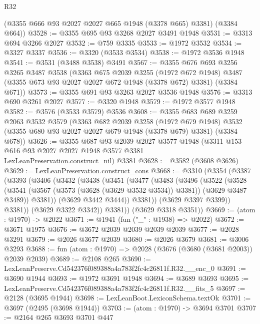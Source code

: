 \begin{lexlean}{R32}
\begin{coremodule}
      (@3355 @666 @93 @2027 @2027 @665 @1948 (@3378 @665) @3381)
      (@3384 @664))
@3528 := @3355 @695 @93 @3268 @2027 @3491 @1948
@3531 := @3313 @694 @3266 @2027
@3532 := @759 @3335
@3533 := @1972 @3532
@3534 := @3327 @3337
@3536 := @3320 (@3533 @3534)
@3538 := @1972 @3536 @1948
@3541 := @3531 (@3488 @3538) @3491
@3567 := @3355
    @676
    @693
    @3256
    @3265
    @3487
    @3538
    (@3363
      @675
      @2039
      @3255
      (@1972 @672 @1948)
      @3487
      (@3355 @673 @93 @2027 @2027 @672 @1948 (@3378 @672) @3381)
      (@3384 @671))
@3573 := @3355 @691 @93 @3263 @2027 @3536 @1948
@3576 := @3313 @690 @3261 @2027
@3577 := @3320 @1948
@3579 := @1972 @3577 @1948
@3582 := @3576 (@3533 @3579) @3536
@3608 := @3355
    @683
    @689
    @3259
    @2063
    @3532
    @3579
    (@3363
      @682
      @2039
      @3258
      (@1972 @679 @1948)
      @3532
      (@3355 @680 @93 @2027 @2027 @679 @1948 (@3378 @679) @3381)
      (@3384 @678))
@3626 := @3355
    @687
    @93
    @2039
    @2027
    @3577
    @1948
    (@3311 @153 @616 @93 @2027 @2027 @1948 @3577 @3381 LexLeanPreservation.construct_nil)
    @3381
@3628 := @3582 (@3608 @3626)
@3629 := LexLeanPreservation.construct_cons
@3668 := @3310
    (@3354
      (@3387
        (@3393
          (@3406
            (@3432
              (@3438
                (@3451
                  (@3477
                    (@3483
                      (@3496
                        (@3522
                          (@3528
                            (@3541
                              (@3567 (@3573 (@3628 (@3629 @3532 @3534)) @3381))
                              (@3629 @3487 @3489))
                            @3381))
                        (@3629 @3442 @3444))
                      @3381))
                  (@3629 @3397 @3399))
                @3381))
            (@3629 @3322 @3342))
          @3381))
      (@3629 @3318 @3351))
@3669 := (atom : @1970) -> @2022
@3671 := @1941 (fun ("_" : @1938) => @2022)
@3672 := @3671 @1975
@3676 := @3672 @2039 @2039 @2039 @2039
@3677 := @2028 @3291
@3679 := @2026 @3677 @2039
@3680 := @2026 @3679
@3681 := @3006 @3293
@3688 := fun (atom : @1970) => @2028 (@3676 (@3680 (@3681 @2003)) @2039 @2039)
@3689 := @2108 @265
@3690 := LexLeanPreserve.Cd542376f089388a4a783f2fc4c26811f.R32.__enc_0
@3691 := @3690 @1944
@3693 := @1972 @3691 @1948
@3694 := @3689 @3693
@3695 := LexLeanPreserve.Cd542376f089388a4a783f2fc4c26811f.R32.__fits_5
@3697 := @2128 (@3695 @1944)
@3698 := LexLeanBoot.LexiconSchema.textOk
@3701 := @3697 (@2495 (@3698 @1944))
@3703 := (atom : @1970) -> @3694 @3701
@3707 := @2164 @265 @3693 @3701 @447

\end{coremodule}
\end{lexlean}

